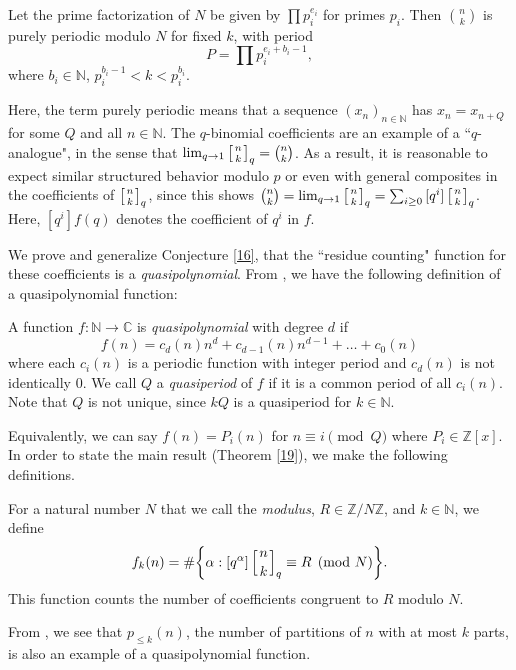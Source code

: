 \documentclass[12pt]{article}
\newcommand{\set}[1]{{\left\{{#1}\right\}}}
\newcommand{\Z}{\mathbb{Z}}
\newcommand{\N}{\mathbb{N}}
\newcommand{\qbinom}[2]{\left[{#1 \atop #2}\right]_q}
\begin{document}
\begin{theorem}
Let the prime factorization of $N$ be given by $\prod{p_i^{e_i}}$ for primes $p_i$. Then $\binom{n}{k}$ is purely periodic modulo $N$ for fixed $k$, with period
\[P = \prod{p_i^{e_i+b_i-1}},\]
where $b_i\in \N$, $p_i^{b_i-1}<k<p_i^{b_i}$.
\label{13}
\end{theorem}

\noindent Here, the term purely periodic means that a sequence $(x_n)_{n \in \N}$ has $x_{n}=x_{n+Q}$ for some $Q$ and all $n\in \N$. The $q$-binomial coefficients are an example of a ``$q$-analogue", in the sense that $\lim_{q\to 1}\qbinom{n}{k}=\binom{n}{k}$. As a result, it is reasonable to expect similar structured behavior modulo $p$ or even with general composites in the coefficients of $\qbinom{n}{k}$, since this shows $\binom{n}{k} = \lim_{q\to 1}{\qbinom{n}{k}}=\sum_{i\ge 0}{[q^i]\qbinom{n}{k}}$. Here, $[q^i]f(q)$ denotes the coefficient of $q^i$ in $f$.

We prove and generalize Conjecture \ref{16}, that the ``residue counting" function for these coefficients is a \textit{quasipolynomial}. From \cite{stanley}, we have the following definition of a quasipolynomial function:

\begin{definition}
A function $f: \N \to \mathbb{C}$ is \textit{quasipolynomial} with degree $d$ if
\[f(n) = c_d(n)n^d + c_{d-1}(n)n^{d-1} + \ldots + c_0(n)\]
where each $c_i(n)$ is a periodic function with integer period and $c_d(n)$ is not identically $0$. We call $Q$ a \textit{quasiperiod} of $f$ if it is a common period of all $c_i(n)$. Note that $Q$ is not unique, since $kQ$ is a quasiperiod for $k\in \N$.
\label{14}
\end{definition}

\noindent Equivalently, we can say $f(n)=P_i(n)$ for $n \equiv i \pmod{Q}$ where $P_i \in \Z[x]$. In order to state the main result (Theorem \ref{19}), we make the following definitions.

\begin{definition}
For a natural number $N$ that we call the \textit{modulus}, $R \in \Z/N \Z$, and $k \in \N$, we define
\[f_{k}(n) = \#\set{\alpha : [q^{\alpha}] \qbinom{n}{k}  \equiv R \pmod{N}}.\]
This function counts the number of coefficients congruent to $R$ modulo $N$.
\label{15}
\end{definition}

\begin{remark}
From \cite{kparts}, we see that $p_{\le k}(n)$, the number of partitions of $n$ with at most $k$ parts, is also an example of a quasipolynomial function.
\end{remark}
\end{document}
